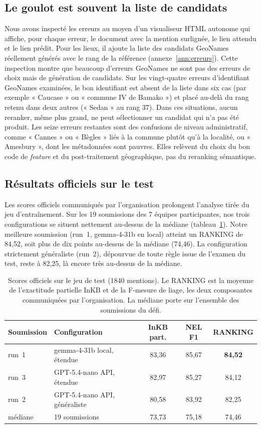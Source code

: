 \documentclass[10pt,twoside]{article}
\begin{document}
\subsection{Le goulot est souvent la liste de candidats}
\label{subsec:goulot}
Nous avons inspecté les erreurs au moyen d'un visualiseur HTML autonome qui affiche, pour chaque
erreur, le document avec la mention surlignée, le lien attendu et le lien prédit. Pour les lieux,
il ajoute la liste des candidats GeoNames réellement générés avec le rang de la référence
(annexe~\ref{ann:erreurs}). Cette inspection montre que beaucoup d'erreurs GeoNames ne sont pas
des erreurs de choix mais de génération de candidats. Sur les vingt-quatre erreurs d'identifiant
GeoNames examinées, le bon identifiant est
absent de la liste dans six cas (par exemple « Caucase » ou « commune IV de Bamako ») et placé au-delà du
rang retenu dans deux autres (« Sedan » au rang 37). Dans ces situations, aucun reranker, même
plus grand, ne peut sélectionner un candidat qui n'a pas été produit. Les seize erreurs restantes
sont des confusions de niveau administratif, comme « Cannes » ou « Bègles » liés à la commune
plutôt qu'à la localité, ou « Amesbury », dont les métadonnées sont pauvres. Elles relèvent du choix du bon
code de \emph{feature} et du post-traitement géographique, pas du reranking sémantique.

\subsection{Résultats officiels sur le test}
Les scores officiels communiqués par l'organisation prolongent l'analyse tirée du jeu d'entraînement. Sur les 19
soumissions des 7 équipes participantes, nos trois configurations se situent nettement au-dessus
de la médiane (tableau~\ref{tab:test}). Notre meilleure soumission (run~1, gemma-4-31b en local)
atteint un RANKING de 84,52, soit plus de dix points au-dessus de la médiane (74,46). La
configuration strictement généraliste (run~2), dépourvue de toute règle issue de l'examen du test,
reste à 82,25, là encore très au-dessus de la médiane.

\begin{table}[!h]
\centering
\small
\setlength{\tabcolsep}{4pt}
\begin{tabular}{llccc}
\toprule
Soumission & Configuration & InKB part. & NEL F1 & RANKING \\
\midrule
run~1 & gemma-4-31b local, étendue & 83,36 & 85,67 & \textbf{84,52} \\
run~3 & GPT-5.4-nano API, étendue & 82,97 & 85,27 & 84,12 \\
run~2 & GPT-5.4-nano API, généraliste & 80,58 & 83,92 & 82,25 \\
\midrule
médiane & 19 soumissions & 73,73 & 75,18 & 74,46 \\
\bottomrule
\end{tabular}
\caption{Scores officiels sur le jeu de test (1840 mentions). Le RANKING est la moyenne de
l'exactitude partielle InKB et de la F-mesure de liage, les deux composantes communiquées par
l'organisation. La médiane porte sur l'ensemble des soumissions du défi.}
\label{tab:test}
\end{table}
\end{document}
